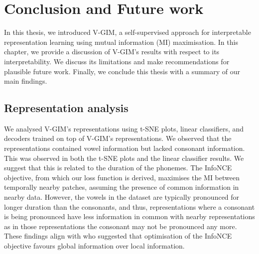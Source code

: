 \chapter{Conclusion and Future work} \label{cha:6}

	
In this thesis, we introduced V-GIM, a self-supervised approach for interpretable representation learning using mutual information (MI) maximisation. In this chapter, we provide a discussion of V-GIM's results with respect to its interpretability. We discuss its limitations and make recommendations for plausible future work. Finally, we conclude this thesis with a summary of our main findings.




\section{Representation analysis}
	
	We analysed V-GIM's representations using t-SNE plots, linear classifiers, and decoders trained on top of V-GIM's representations. We observed that the representations contained vowel information but lacked consonant information. This was observed in both the t-SNE plots and the linear classifier results. We suggest that this is related to the duration of the phonemes. The InfoNCE objective, from which our loss function is derived, maximises the MI between temporally nearby patches, assuming the presence of common information in nearby data. However, the vowels in the dataset are typically pronounced for longer duration than the consonants, and thus, representations where a consonant is being pronounced have less information in common with nearby representations as in those representations the consonant may not be pronounced any more. These findings align with \cite{lowePuttingEndEndtoEnd2020a} who suggested that optimisation of the InfoNCE objective favours global information over local information. 
	
